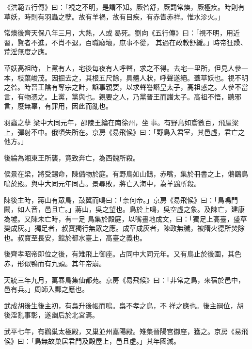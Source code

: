 
\begin{pinyinscope}

 《洪範五行傳》曰：「視之不明，是謂不知。厥咎舒，厥罰常燠，厥極疾。時則有草妖，時則有羽蟲之孽。故有羊禍，故有目疾，有赤眚赤祥。惟水沴火。」



 常燠後齊天保八年三月，大熱，人或曷死。劉向《五行傳》曰：「視不明，用近習，賢者不進，不肖不退，百職廢壞，庶事不從，
 其過在政教舒緩。」時帝狂躁、荒淫無度之應。



 草妖高祖時，上黨有人，宅後每夜有人呼聲，求之不得。去宅一里所，但見人參一本，枝葉峻茂。因掘去之，其根五尺餘，具體人狀，呼聲遂絕。蓋草妖也。視不明之咎。時晉王陰有奪宗之計，諂事親要，以求聲譽譖皇太子，高祖惑之。人參不當言，有物憑之。上黨，黨與也。親要之人，乃黨晉王而譖太子。高祖不悟，聽邪言，廢無辜，有罪用，因此而亂也。



 羽蟲之孽
 梁中大同元年，邵陵王綸在南徐州，坐事。有野鳥如鳶數百，飛屋梁上，彈射不中。俄頃失所在。京房《易飛候》曰：「野鳥入君室，其邑虛，君亡之他方。」



 後綸為湘東王所襲，竟致奔亡，為西魏所殺。



 侯景在梁，將受錫命，陳備物於庭。有野鳥如山鵲，赤嘴，集於冊書之上，鵂鶹鳥鳴於殿。與中大同元年同占。景尋敗，將亡入海中，為羊鵾所殺。



 陳後主時，蔣山有眾鳥，鼓翼而鳴曰：「奈何帝。」京房《易飛候》曰：「鳥鳴門闕，如人音，邑且亡。」蔣山，吳之望也。鳥於上鳴，吳空虛之象。及陳亡，建康為墟。又陳未亡時，有一足
 鳥集於殿庭，以嘴畫地成文，曰：「獨足上高臺，盛草變成灰。」獨足者，叔寶獨行無眾之應。成草成灰者，陳政無穢，被隋火德所焚除也。叔寶至長安，館於都水臺上，高臺之義也。



 後齊孝昭帝即位之後，有雉飛上御座。占同中大同元年。又有鳥止於後園，其色赤，形似鴨而有九頭。其年帝崩。



 天統三年九月，萬春鳥集仙都苑。京房《易飛候》曰：「非常之鳥，來宿於邑中，邑有兵。」周師入鄴之應也。



 武成胡後生後主初，有梟升後帳而鳴。梟不孝之鳥，不
 祥之應也。後主嗣位，胡後淫亂事彰，遂幽后於北宮焉。



 武平七年，有鸛巢太極殿，又巢並州嘉陽殿。雉集晉陽宮御座，獲之。京房《易飛候》曰：「鳥無故巢居君門及殿屋上，邑且虛。」其年國滅。




\end{pinyinscope}
